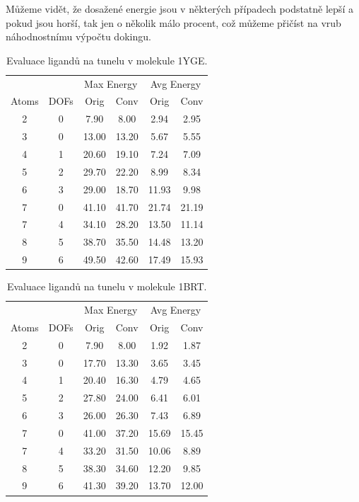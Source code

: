 Můžeme vidět, že dosažené energie jsou v některých případech podstatně lepší
a pokud jsou horší, tak jen o několik málo procent, což můžeme přičíst na vrub
náhodnostnímu výpočtu dokingu.

\begin{table}[ht]
    \centering
    \begin{tabular}{cccccc}
    \toprule
        & & \multicolumn{2}{c}{Max Energy} & \multicolumn{2}{c}{Avg Energy} \\
        Atoms & DOFs & Orig & Conv & Orig & Conv \\
        \midrule
            2 & 0 & 7.90  &8.00 & 2.94 & 2.95 \\
            3 & 0 & 13.00 & 13.20 & 5.67 & 5.55 \\
            4 & 1 & 20.60 & 19.10 & 7.24 & 7.09 \\
            5 & 2 & 29.70 & 22.20 & 8.99 & 8.34 \\
            6 & 3 & 29.00 & 18.70 & 11.93 & 9.98 \\
            7 & 0 & 41.10 & 41.70 & 21.74 & 21.19 \\
            7 & 4 & 34.10 & 28.20 & 13.50 & 11.14 \\
            8 & 5 & 38.70 & 35.50 & 14.48 & 13.20 \\
            9 & 6 & 49.50 & 42.60 & 17.49 & 15.93 \\
        \bottomrule
    \end{tabular}
    \caption{Evaluace ligandů na tunelu v molekule 1YGE.}
    \label{table:1YGE_energy}
\end{table}

\begin{table}[ht]
    \centering
    \begin{tabular}{cccccc}
    \toprule
        & & \multicolumn{2}{c}{Max Energy} & \multicolumn{2}{c}{Avg Energy} \\
        Atoms & DOFs & Orig & Conv & Orig & Conv \\
        \midrule
            2 & 0 & 7.90 & 8.00 & 1.92 & 1.87 \\
            3 & 0 & 17.70 & 13.30 & 3.65 & 3.45 \\
            4 & 1 & 20.40 & 16.30 & 4.79 & 4.65 \\
            5 & 2 & 27.80 & 24.00 & 6.41 & 6.01 \\
            6 & 3 & 26.00 & 26.30 & 7.43 & 6.89 \\
            7 & 0 & 41.00 & 37.20 & 15.69 & 15.45 \\
            7 & 4 & 33.20 & 31.50 & 10.06 & 8.89 \\
            8 & 5 & 38.30 & 34.60 & 12.20 & 9.85 \\
            9 & 6 & 41.30 & 39.20 & 13.70 & 12.00 \\
        \bottomrule
    \end{tabular}
    \caption{Evaluace ligandů na tunelu v molekule 1BRT.}
    \label{table:1BRT_energy}
\end{table}

